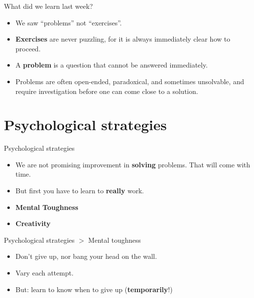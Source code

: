 \documentclass{beamer}
\begin{document}
\begin{frame}{What did we learn last week?}
    \begin{itemize}
        \item We saw ``problems'' not ``exercises''.
        \pause
        \item \textbf{Exercises} are never puzzling, for it is always immediately clear how to proceed.
        \pause
        \item A \textbf{problem} is a question that cannot be answered immediately.
        \pause
        \item Problems are often open-ended, paradoxical, and sometimes unsolvable, and require investigation before one can come close to a solution.
    \end{itemize}
\end{frame}

\section{Psychological strategies}

\begin{frame}{Psychological strategies}
    \begin{itemize}
        \item We are not promising improvement in \textbf{solving} problems. That will come with time.
        \pause
        \item But first you have to learn to \textbf{really} work.
        \pause
        \item \textbf{Mental Toughness}
        \pause
        \item \textbf{Creativity}
    \end{itemize}
\end{frame}

\begin{frame}{Psychological strategies $>$ Mental toughness}
    \begin{itemize}
        \item Don’t give up, nor bang your head on the wall.
        \pause
        \item Vary each attempt.
        \pause
        \item But: learn to know when to give up (\textbf{temporarily}!)
    \end{itemize}
\end{frame}
\end{document}
